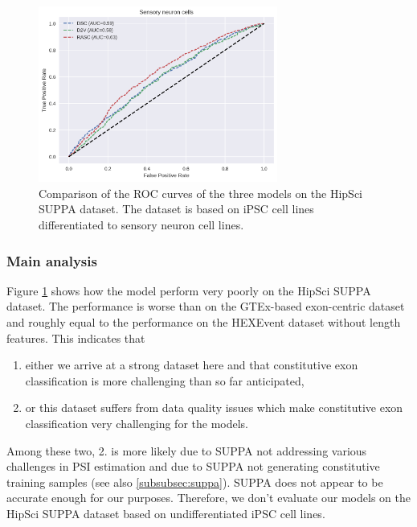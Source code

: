 \begin{figure}
	\centering\includegraphics[width=0.7\textwidth]{../visualizations/ch5-results/suppa_cross_model_roc_auc_comparison.png} 
	\caption{Comparison of the ROC curves of the three models on the HipSci SUPPA dataset. The dataset is based on iPSC cell lines differentiated to sensory neuron cell lines. }
	\label{fig:suppa_auc_roc}
\end{figure}
\subsubsection{Main analysis}
Figure \ref{fig:suppa_auc_roc} shows how the model perform very poorly on the HipSci SUPPA dataset. The performance is worse than on the GTEx-based exon-centric dataset and roughly equal to the performance on the HEXEvent dataset without length features. This indicates that 
\begin{enumerate}
	\item either we arrive at a strong dataset here and that constitutive exon classification is more challenging than so far anticipated,
	\item or this dataset suffers from data quality issues which make constitutive exon classification very challenging for the models.
\end{enumerate}

Among these two, 2. is more likely due to SUPPA not addressing various challenges in PSI estimation and due to SUPPA not generating constitutive training samples (see also \ref{subsubsec:suppa}). SUPPA does not appear to be accurate enough for our purposes. Therefore, we don't evaluate our models on the HipSci SUPPA dataset based on undifferentiated iPSC cell lines.



